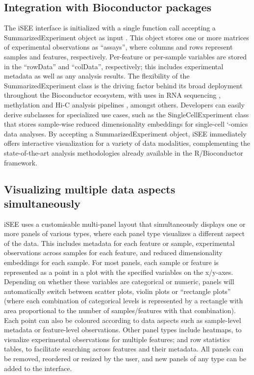 \documentclass{bioinfo}
\begin{document}
\subsection{Integration with Bioconductor packages} 
The iSEE interface is initialized with a single function call accepting a SummarizedExperiment object as input \citep{huber2015orchestrating}.
This object stores one or more matrices of experimental observations as ``assays'', where columns and rows represent samples and features, respectively. 
Per-feature or per-sample variables are stored in the ``rowData'' and ``colData'', respectively; this includes experimental metadata as well as any analysis results. 
The flexibility of the SummarizedExperiment class is the driving factor behind its broad deployment throughout the Bioconductor ecosystem, with uses in RNA sequencing \citep{love2014moderated}, methylation \citep{aryee2014minfi} and Hi-C analysis pipelines \citep{lun2016infrastructure}, amongst others.
Developers can easily derive subclasses for specialized use cases, such as the SingleCellExperiment class that stores sample-wise reduced dimensionality embeddings for single-cell `-omics data analyses. 
By accepting a SummarizedExperiment object, iSEE immediately offers interactive visualization for a variety of data modalities, complementing the state-of-the-art analysis methodologies already available in the R/Bioconductor framework. 

\subsection{Visualizing multiple data aspects simultaneously}
iSEE uses a customisable multi-panel layout that simultaneously displays one or more panels of various types, where each panel type visualizes a different aspect of the data. 
This includes metadata for each feature or sample, experimental observations across samples for each feature, and reduced dimensionality embeddings for each sample. 
For most panels, each sample or feature is represented as a point in a plot with the specified variables on the x/y-axes.
Depending on whether these variables are categorical or numeric, panels will automatically switch between scatter plots, violin plots or ``rectangle plots'' (where each combination of categorical levels is represented by a rectangle with area proportional to the number of samples/features with that combination). 
Each point can also be coloured according to data aspects such as sample-level metadata or feature-level observations. 
Other panel types include heatmaps, to visualize experimental observations for multiple features; and row statistics tables, to facilitate searching across features and their metadata.
All panels can be removed, reordered or resized by the user, and new panels of any type can be added to the interface.
\end{document}
